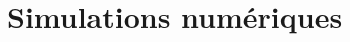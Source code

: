 \documentclass[11pt,french,ignorenonframetext,]{beamer}
\begin{document}







\section{\hfill{}Simulations numériques\hfill{}}
\end{document}

